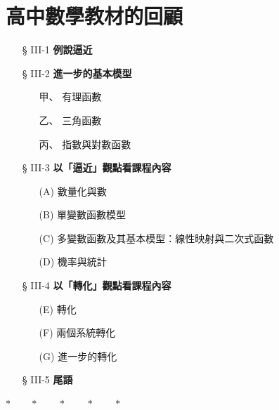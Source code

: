 \section{高中數學教材的回顧}\label{sec:b6s-ch3}\label{sec:b6s-3}

\begin{center}
\begin{minipage}{0.75\textwidth}
\begin{itemize}[leftmargin=3em, itemsep=0.3em]
  \item[§ III-1] \textbf{例說逼近}
  \item[§ III-2] \textbf{進一步的基本模型}
  \begin{itemize}[leftmargin=2em, itemsep=0.2em]
    \item[甲、] 有理函數
    \item[乙、] 三角函數
    \item[丙、] 指數與對數函數
  \end{itemize}
  \item[§ III-3] \textbf{以「逼近」觀點看課程內容}
  \begin{itemize}[leftmargin=2em, itemsep=0.2em]
    \item[(A)] 數量化與數
    \item[(B)] 單變數函數模型
    \item[(C)] 多變數函數及其基本模型：線性映射與二次式函數
    \item[(D)] 機率與統計
  \end{itemize}
  \item[§ III-4] \textbf{以「轉化」觀點看課程內容}
  \begin{itemize}[leftmargin=2em, itemsep=0.2em]
    \item[(E)] 轉化
    \item[(F)] 兩個系統轉化
    \item[(G)] 進一步的轉化
  \end{itemize}
  \item[§ III-5] \textbf{尾語}
\end{itemize}
\end{minipage}
\end{center}

\begin{center}
$* \qquad * \qquad * \qquad * \qquad *$
\end{center}

